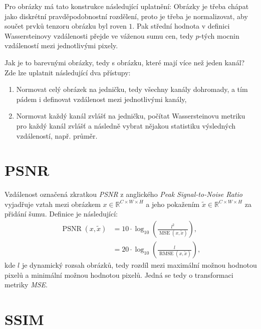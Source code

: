 \documentclass[czech]{article}
\begin{document}
Pro obrázky má tato konstrukce následující uplatnění:
Obrázky je třeba chápat jako diskrétní pravděpodobnostní rozdělení,
proto je třeba je normalizovat,
aby součet prvků tenzoru obrázku byl roven $1$.
Pak střední hodnota v definici Wassersteinovy vzdálenosti přejde ve váženou sumu cen,
tedy $p$-tých mocnin vzdáleností mezi jednotlivými pixely.

Jak je to barevnými obrázky, tedy s obrázku, které mají více než jeden kanál?
Zde lze uplatnit následující dva přístupy:
\begin{enumerate}
    \item Normovat celý obrázek na jedničku, tedy všechny kanály dohromady, a tím pádem i definovat vzdálenost mezi jednotlivými kanály,
    \item Normovat každý kanál zvlášť na jedničku, počítat Wassersteinovu metriku pro každý kanál zvlášť
    a následně vybrat nějakou statistiku výsledných vzdáleností, např. průměr.
\end{enumerate}

\section{PSNR}

Vzdálenost označená zkratkou \emph{PSNR} z anglického \emph{Peak Signal-to-Noise Ratio}
vyjadřuje vztah mezi obrázkem $x \in \mathbb{R}^{C \times W \times H}$
a jeho pokažením $\tilde{x} \in \mathbb{R}^{C \times W \times H}$ za přidání šumu.
Definice je následující:
\begin{align}
    \operatorname{PSNR}(x, \tilde{x}) &= 10 \cdot \operatorname{log}_{10} \left( \frac{l^2}{\operatorname{MSE}(x, \tilde{x})} \right), \\
    &= 20 \cdot \operatorname{log}_{10} \left( \frac{l}{\operatorname{RMSE}(x, \tilde{x})} \right),
\end{align}
kde $l$ je dynamický rozsah obrázků, tedy rozdíl mezi maximální možnou hodnotou pixelů a minimální možnou hodnotou pixelů.
Jedná se tedy o transformaci metriky \emph{MSE}.

\section{SSIM}
\end{document}
